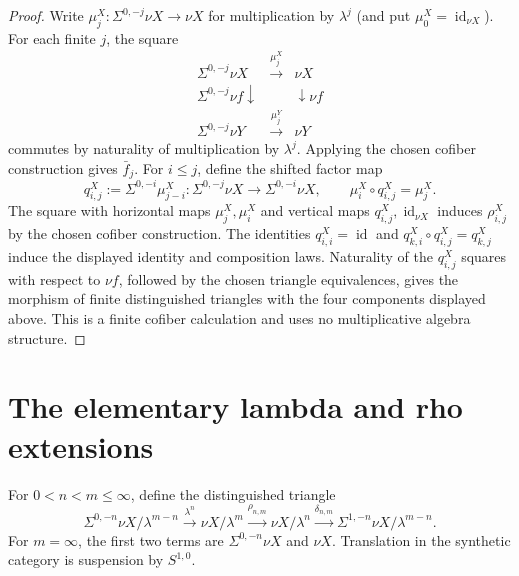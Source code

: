 \begin{proof}
  Write $\mu^X_j:\Sigma^{0,-j}\nu X\to\nu X$ for multiplication by
  $\lambda^j$ (and put $\mu^X_0=\operatorname{id}_{\nu X}$).  For each finite
  $j$, the square
  \[
    \begin{array}{ccc}
      \Sigma^{0,-j}\nu X & \xrightarrow{\mu^X_j} & \nu X \\
      {\scriptstyle\Sigma^{0,-j}\nu f}\downarrow && \downarrow{\scriptstyle\nu f} \\
      \Sigma^{0,-j}\nu Y & \xrightarrow{\mu^Y_j} & \nu Y
    \end{array}
  \]
  commutes by naturality of multiplication by $\lambda^j$.  Applying the
  chosen cofiber construction gives $\bar f_j$.  For $i\le j$, define the shifted
  factor map
  \[
    q^X_{i,j}:=\Sigma^{0,-i}\mu^X_{j-i}:
      \Sigma^{0,-j}\nu X\longrightarrow\Sigma^{0,-i}\nu X,
    \qquad \mu^X_i\circ q^X_{i,j}=\mu^X_j.
  \]
  The square with horizontal maps $\mu^X_j,\mu^X_i$ and vertical maps
  $q^X_{i,j},\operatorname{id}_{\nu X}$ induces $\rho^X_{i,j}$ by the
  chosen cofiber construction.  The identities
  $q^X_{i,i}=\operatorname{id}$ and
  $q^X_{k,i}\circ q^X_{i,j}=q^X_{k,j}$ induce the displayed identity and
  composition laws.  Naturality of the $q^X_{i,j}$ squares with respect to
  $\nu f$, followed by the chosen triangle equivalences, gives the morphism
  of finite distinguished triangles with the four components displayed above.
  This is a finite cofiber calculation and uses no multiplicative algebra
  structure.
\end{proof}

\section{The elementary lambda and rho extensions}

\begin{definition}
  \label{def:lambda-rho-delta-triangle}
  \notready
  For $0<n<m\le\infty$, define the distinguished triangle
  \[
    \Sigma^{0,-n}\nu X/\lambda^{m-n}
      \xrightarrow{\lambda^n}\nu X/\lambda^m
      \xrightarrow{\rho_{n,m}}\nu X/\lambda^n
      \xrightarrow{\delta_{n,m}}
      \Sigma^{1,-n}\nu X/\lambda^{m-n}.
  \]
  For $m=\infty$, the first two terms are
  $\Sigma^{0,-n}\nu X$ and $\nu X$.  Translation in the synthetic category is
  suspension by $S^{1,0}$.
\end{definition}
